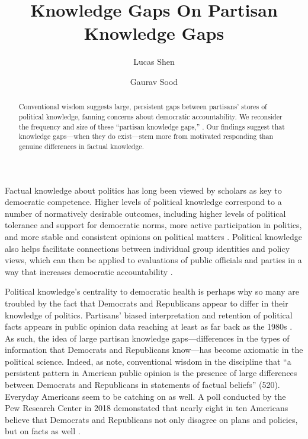 \documentclass[12pt, letterpaper]{article}
\title{Knowledge Gaps On Partisan Knowledge Gaps}
\author{Lucas Shen \and Gaurav Sood}
\begin{document}
\maketitle
\thispagestyle{empty}

\begin{abstract}

\noindent Conventional wisdom suggests large, persistent gaps between partisans' stores of political knowledge, fanning concerns about democratic accountability. We reconsider the frequency and size of these ``partisan knowledge gaps,'' . Our findings suggest that knowledge gaps---when they do exist---stem more from motivated responding than genuine differences in factual knowledge.

\end{abstract}

\vspace{.2in}

\newpage

\doublespacing

Factual knowledge about politics has long been viewed by scholars as key to democratic competence. Higher levels of political knowledge correspond to a number of normatively desirable outcomes, including higher levels of political tolerance and support for democratic norms, more active participation in politics, and more stable and consistent opinions on political matters \citep{Converse1964,dellicarpini,galston_2001}. Political knowledge also helps facilitate connections between individual group identities and policy views, which can then be applied to evaluations of public officials and parties in a way that increases democratic accountability \citep{dellicarpini}.

Political knowledge's centrality to democratic health is perhaps why so many are troubled by the fact that Democrats and Republicans appear to differ in their knowledge of politics. Partisans' biased interpretation and retention of political facts appears in public opinion data reaching at least as far back as the 1980s \citep[e.g.,][]{bartels_2002,jerit2012partisan}. As such, the idea of large partisan knowledge gaps---differences in the types of information that Democrats and Republicans know---has become axiomatic in the political science. Indeed, as \citet{bullocketal_2015} note, conventional wisdom in the discipline that ``a persistent pattern in American public opinion is the presence of large differences between Democrats and Republicans in statements of factual beliefs'' (520). Everyday Americans seem to be catching on as well. A poll conducted by the Pew Research Center in 2018 demonstated that nearly eight in ten Americans believe that Democrats and Republicans not only disagree on plans and policies, but on facts as well \citep{pew2018disagree}. 
\end{document}
